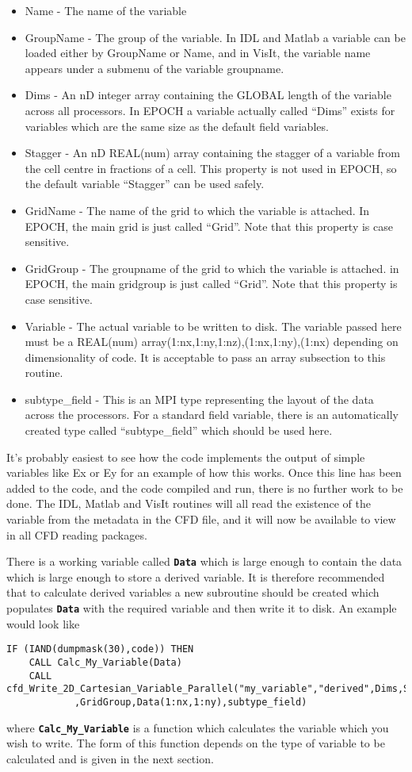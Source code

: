 \documentclass[12pt]{article}
\newcommand{\simpleboxverbatim}{\begin{Verbatim}[obeytabs=true,frame=single,
  framerule=0.5mm,rulecolor=\color{warwickmid}]}
\newcommand{\inlinecode}[1]{{\color{warwickred} \bf\texttt{#1}}}
\newcommand{\EPOCH}{{\color{warwickdark}\fontfamily{phv}\selectfont EPOCH} }
\begin{document}
\begin{itemize}
\item Name - The name of the variable
\item GroupName - The group of the variable. In IDL and Matlab a variable can
  be loaded either by GroupName or Name, and in VisIt, the variable name
  appears under a submenu of the variable groupname.
\item Dims - An nD integer array containing the GLOBAL length of the variable
  across all processors. In \EPOCH a variable actually called ``Dims'' exists
  for variables which are the same size as the default field variables.
\item Stagger - An nD REAL(num) array containing the stagger of a variable from
  the cell centre in fractions of a cell. This property is not used in EPOCH,
  so the default variable ``Stagger'' can be used safely.
\item GridName - The name of the grid to which the variable is attached. In
  EPOCH, the main grid is just called ``Grid''. Note that this property is case
  sensitive.
\item GridGroup - The groupname of the grid to which the variable is
  attached. in EPOCH, the main gridgroup is just called ``Grid''. Note that
  this property is case sensitive.
\item Variable - The actual variable to be written to disk. The variable passed
  here must be a REAL(num) array(1:nx,1:ny,1:nz),(1:nx,1:ny),(1:nx) depending
  on dimensionality of code. It is acceptable to pass an array subsection to
  this routine.
\item subtype\_field - This is an MPI type representing the layout of the data
  across the processors. For a standard field variable, there is an
  automatically created type called ``subtype\_field'' which should be used
  here.
\end{itemize}

It's probably easiest to see how the code implements the output of simple
variables like Ex or Ey for an example of how this works. Once this line has
been added to the code, and the code compiled and run, there is no further work
to be done. The IDL, Matlab and VisIt routines will all read the existence of
the variable from the metadata in the CFD file, and it will now be available to
view in all CFD reading packages.

There is a working variable called \inlinecode{Data} which is large enough to
contain the data which is large enough to store a derived variable. It is
therefore recommended that to calculate derived variables a new subroutine
should be created which populates \inlinecode{Data} with the required variable
and then write it to disk. An example would look like
\simpleboxverbatim
IF (IAND(dumpmask(30),code)) THEN
	CALL Calc_My_Variable(Data)
	CALL cfd_Write_2D_Cartesian_Variable_Parallel("my_variable","derived",Dims,Stagger,GridName&
            ,GridGroup,Data(1:nx,1:ny),subtype_field)
\end{Verbatim}
where \inlinecode{Calc\_My\_Variable} is a function which calculates the
variable which you wish to write. The form of this function depends on the type
of variable to be calculated and is given in the next section.
\end{document}
